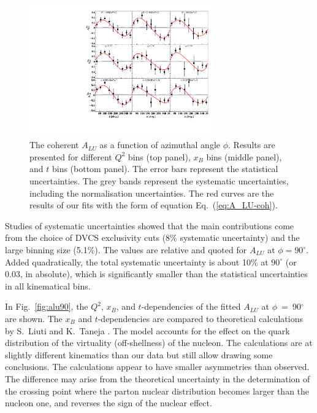 \documentclass[twocolumn,nofootinbib,showpacs,prl,superscriptaddress,secnumarabic,amssymb,nobibnotes,aps,floatfix]{revtex4}
\begin{document}
\begin{figure}[tb]
\includegraphics[width=8cm]{figs/coherent-ALU.pdf}
\caption{The coherent $A_{LU}$ as a function of azimuthal angle $\phi$. Results are presented
   for different $Q^{2}$ bins (top panel), $x_{B}$ bins (middle panel), and $t$ 
   bins (bottom panel).  The error bars represent the statistical 
   uncertainties. The grey bands represent the systematic uncertainties, 
   including the normalisation uncertainties. The red curves are the results of 
our fits with the form of equation Eq.~(\ref{eq:A_LU-coh}).}
\label{fig:alu}
\end{figure}

Studies of systematic uncertainties showed that the main contributions 
come from the choice of DVCS exclusivity cuts (8\% systematic uncertainty) and the 
large binning size (5.1\%). The values are relative and quoted for $A_{LU}$
at $\phi=90^\circ$. Added quadratically, the total systematic uncertainty
is about 10\% at $90^\circ$ (or 0.03, in absolute), which is significantly smaller
than the statistical uncertainties in all kinematical bins. 

In Fig.~\ref{fig:alu90}, the $Q^2$, $x_{B}$, and $t$-dependencies of the fitted 
$A_{LU}$ at $\phi$~=~90$^{\circ}$ are shown. The $x_{B}$ and $t$-dependencies 
are compared to theoretical calculations by S.~Liuti and K.~Taneja 
\cite{simonetta_2}. The model accounts for the effect on the quark distribution 
of the virtuality (off-shellness) of the nucleon. The calculations are at slightly 
different kinematics than our data but still allow drawing some conclusions. The 
calculations appear to have smaller asymmetries than observed. 
The difference may arise from the theoretical uncertainty in the determination 
of the crossing point where the parton nuclear distribution becomes larger than the 
nucleon one, and reverses the sign of the nuclear effect.
\end{document}

